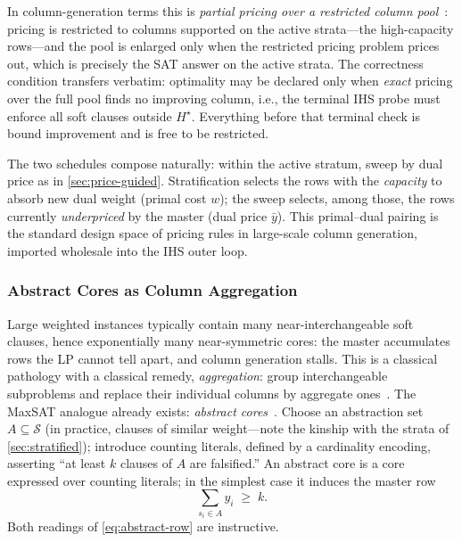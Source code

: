 In column-generation terms this is \emph{partial pricing over a restricted
column pool}~\citep{desaulniers2005column}: pricing is restricted to
columns supported on the active strata---the high-capacity rows---and the
pool is enlarged only when the restricted pricing problem prices out,
which is precisely the SAT answer on the active strata. The correctness
condition transfers verbatim: optimality may be declared only when
\emph{exact} pricing over the full pool finds no improving column, i.e.,
the terminal IHS probe must enforce all soft clauses outside $H^\star$.
Everything before that terminal check is bound improvement and is free to
be restricted.

The two schedules compose naturally: within the active stratum, sweep by
dual price as in \cref{sec:price-guided}. Stratification selects the rows
with the \emph{capacity} to absorb new dual weight (primal cost $w$); the
sweep selects, among those, the rows currently \emph{underpriced} by the
master (dual price $\bar y$). This primal--dual pairing is the standard
design space of pricing rules in large-scale column generation, imported
wholesale into the IHS outer loop.

\subsubsection{Abstract Cores as Column Aggregation}
\label{sec:abstract-cores}

Large weighted instances typically contain many near-interchangeable soft
clauses, hence exponentially many near-symmetric cores: the master
accumulates rows the LP cannot tell apart, and column generation stalls.
This is a classical pathology with a classical remedy,
\emph{aggregation}: group interchangeable subproblems and replace their
individual columns by aggregate ones~\citep{desaulniers2005column}. The
MaxSAT analogue already exists: \emph{abstract
cores}~\citep{berg2020abstract}. Choose an abstraction set $A \subseteq
\mathcal{S}$ (in practice, clauses of similar weight---note the kinship
with the strata of \cref{sec:stratified}); introduce counting literals,
defined by a cardinality encoding, asserting ``at least $k$ clauses of $A$
are falsified.'' An abstract core is a core expressed over counting
literals; in the simplest case it induces the master row
\begin{equation}
\sum_{s_i \in A} y_i \;\ge\; k.
\label{eq:abstract-row}
\end{equation}
Both readings of \eqref{eq:abstract-row} are instructive.

